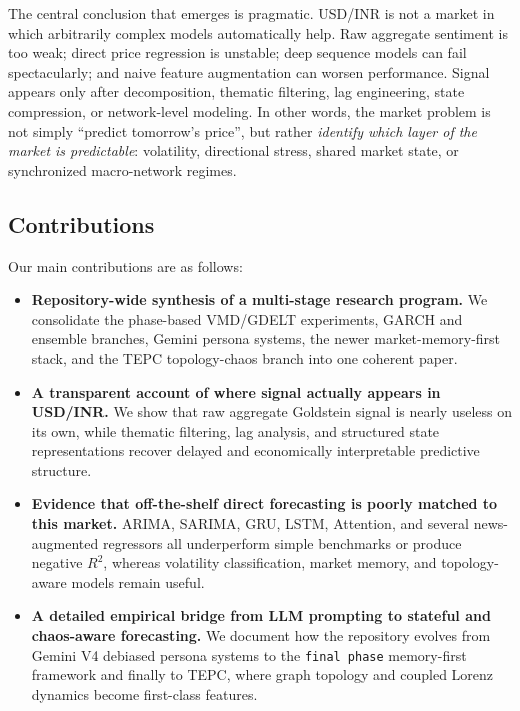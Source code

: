 \documentclass[11pt,a4paper]{article}
\begin{document}
The central conclusion that emerges is pragmatic. USD/INR is not a market in which arbitrarily complex models automatically help. Raw aggregate sentiment is too weak; direct price regression is unstable; deep sequence models can fail spectacularly; and naive feature augmentation can worsen performance. Signal appears only after decomposition, thematic filtering, lag engineering, state compression, or network-level modeling. In other words, the market problem is not simply ``predict tomorrow's price'', but rather \textit{identify which layer of the market is predictable}: volatility, directional stress, shared market state, or synchronized macro-network regimes.

\subsection{Contributions}

Our main contributions are as follows:

\begin{itemize}[leftmargin=*]
    \item \textbf{Repository-wide synthesis of a multi-stage research program.} We consolidate the phase-based VMD/GDELT experiments, GARCH and ensemble branches, Gemini persona systems, the newer market-memory-first stack, and the TEPC topology-chaos branch into one coherent paper.

    \item \textbf{A transparent account of where signal actually appears in USD/INR.} We show that raw aggregate Goldstein signal is nearly useless on its own, while thematic filtering, lag analysis, and structured state representations recover delayed and economically interpretable predictive structure.

    \item \textbf{Evidence that off-the-shelf direct forecasting is poorly matched to this market.} ARIMA, SARIMA, GRU, LSTM, Attention, and several news-augmented regressors all underperform simple benchmarks or produce negative $R^2$, whereas volatility classification, market memory, and topology-aware models remain useful.

    \item \textbf{A detailed empirical bridge from LLM prompting to stateful and chaos-aware forecasting.} We document how the repository evolves from Gemini V4 debiased persona systems to the \texttt{final phase} memory-first framework and finally to TEPC, where graph topology and coupled Lorenz dynamics become first-class features.
\end{itemize}
\end{document}
